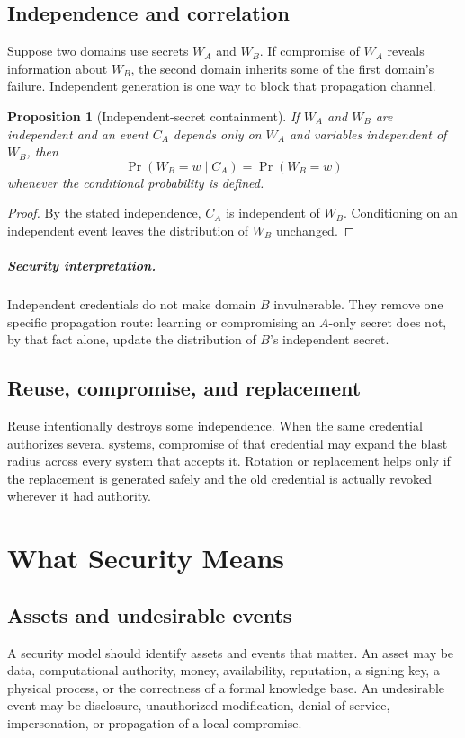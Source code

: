 \documentclass[11pt,oneside]{book}
\newtheorem{proposition}[theorem]{Proposition}
\theoremstyle{definition}
\theoremstyle{remark}
\newcommand{\Prb}{\operatorname{Pr}}
\begin{document}
\section{Independence and correlation}
\label{sec:secret-independence}
Suppose two domains use secrets $W_A$ and $W_B$. If compromise of $W_A$ reveals information about $W_B$, the second domain inherits some of the first domain's failure. Independent generation is one way to block that propagation channel.

\begin{proposition}[Independent-secret containment]
If $W_A$ and $W_B$ are independent and an event $C_A$ depends only on $W_A$ and variables independent of $W_B$, then
\[
\Prb(W_B=w\mid C_A)=\Prb(W_B=w)
\]
whenever the conditional probability is defined.
\end{proposition}

\begin{proof}
By the stated independence, $C_A$ is independent of $W_B$. Conditioning on an independent event leaves the distribution of $W_B$ unchanged.
\end{proof}

\paragraph{Security interpretation.} Independent credentials do not make domain $B$ invulnerable. They remove one specific propagation route: learning or compromising an $A$-only secret does not, by that fact alone, update the distribution of $B$'s independent secret.

\section{Reuse, compromise, and replacement}
Reuse intentionally destroys some independence. When the same credential authorizes several systems, compromise of that credential may expand the blast radius across every system that accepts it. Rotation or replacement helps only if the replacement is generated safely and the old credential is actually revoked wherever it had authority.

\chapter{What Security Means}
\label{ch:security-means}
\section{Assets and undesirable events}
A security model should identify assets and events that matter. An asset may be data, computational authority, money, availability, reputation, a signing key, a physical process, or the correctness of a formal knowledge base. An undesirable event may be disclosure, unauthorized modification, denial of service, impersonation, or propagation of a local compromise.
\end{document}
